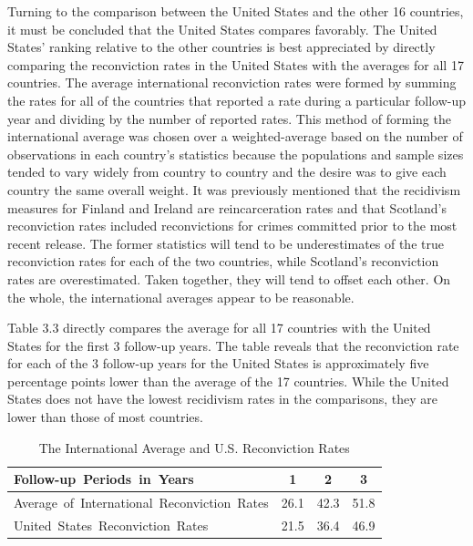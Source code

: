 Turning to the comparison between the United States and the other 16 countries, it must be concluded that the United States compares favorably.  The United States' ranking relative to the other countries is best appreciated by directly comparing the reconviction rates in the United States with the averages for all 17 countries.  The average international reconviction rates were formed by summing the rates for all of the countries that reported a rate during a particular follow-up year and dividing by the number of reported rates.  This method of forming the international average was chosen over a weighted-average based on the number of observations in each country's statistics because the populations and sample sizes tended to vary widely from country to country and the desire was to give each country the same overall weight.  It was previously mentioned that the recidivism measures for Finland and Ireland are reincarceration rates and that Scotland's reconviction rates included reconvictions for crimes committed prior to the most recent release.  The former statistics will tend to be underestimates of the true reconviction rates for each of the two countries, while Scotland's reconviction rates are overestimated.  Taken together, they will tend to offset each other.  On the whole, the international averages appear to be reasonable.

Table 3.3 directly compares the average for all 17 countries with the United States for the first 3 follow-up years.  The table reveals that the reconviction rate for each of the 3 follow-up years for the United States is approximately five percentage points lower than the average of the 17 countries.  While the United States does not have the lowest recidivism rates in the comparisons, they are lower than those of most countries.

\begin{table}[b]
\begin{center}
\caption{The International Average and U.S. Reconviction Rates}
\vspace{0.1cm}
\begin{tabular}{lccc}
  \hline
  \mbox{Follow-up Periods in Years} & 1 & 2 & 3  \\ \hline
  \mbox{Average of International Reconviction Rates} & 26.1 & 42.3 & 51.8 \\
  \mbox{United States Reconviction Rates} & 21.5 & 36.4 & 46.9 \\
  \hline
\end{tabular}
\end{center}
\end{table}

